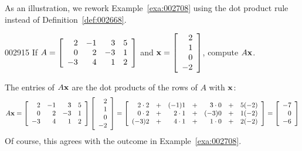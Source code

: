 \noindent As an illustration, we rework Example~\ref{exa:002708} using the dot product rule instead of Definition~\ref{def:002668}.


\begin{example}{}{002915}
If $A = \left[ \begin{array}{rrrr}
2 & -1 & 3 & 5 \\
0 & 2 & -3 & 1 \\
-3 & 4 & 1 & 2
\end{array} \right]$
 and $\textbf{x} = \left[ \begin{array}{r}
 2 \\
 1 \\
 0 \\
 -2
 \end{array} \right]$, compute $A\textbf{x}$.


\begin{solution}
  The entries of $A\textbf{x}$ are the dot products of the rows of $A$ with $\textbf{x}$:
\begin{equation*}
A\textbf{x} = \left[ \begin{array}{rrrr}
2 & -1 & 3 & 5 \\
0 & 2 & -3 & 1 \\
-3 & 4 & 1 & 2
\end{array} \right] \left[ \begin{array}{r}
 2 \\
1 \\
0 \\
-2
\end{array} \right] = \left[ \begin{array}{rrrrrrr}
2 \cdot 2 & + & (-1)1 & + & 3 \cdot 0 & + & 5(-2) \\
0 \cdot 2 & + & 2 \cdot 1 & + & (-3)0 & + & 1(-2) \\
(-3)2 & + & 4 \cdot 1 & + & 1 \cdot 0 & + & 2(-2)
\end{array} \right] = \left[ \begin{array}{r}
-7 \\
0 \\
-6
\end{array} \right]
\end{equation*}
Of course, this agrees with the outcome in Example~\ref{exa:002708}.
\end{solution}
\end{example}

